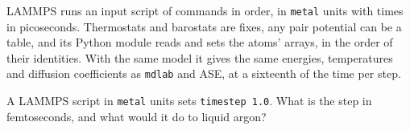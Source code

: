 \begin{keyidea}
LAMMPS runs an input script of commands in order, in \texttt{metal} units
with times in picoseconds. Thermostats and barostats are fixes, any pair
potential can be a table, and its Python module reads and sets the atoms'
arrays, in the order of their identities. With the same model it gives
the same energies, temperatures and diffusion coefficients as
\texttt{mdlab} and ASE, at a sixteenth of the time per step.
\end{keyidea}


\begin{selfcheck}
A LAMMPS script in \texttt{metal} units sets \texttt{timestep 1.0}. What is
the step in femtoseconds, and what would it do to liquid argon?
\end{selfcheck}
